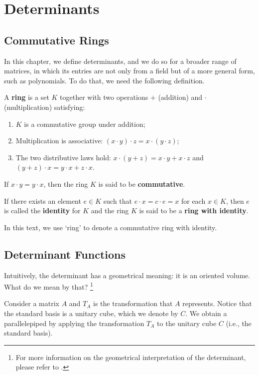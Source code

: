 \chapter{Determinants}\label{chapter:determinants}

\section{Commutative Rings}

In this chapter, we define determinants, and we do so for a broader range of matrices, in which its entries are not only from a field but of a more general form, such as polynomials. To do that, we need the following definition.

\begin{definition}[Ring]
	A \textbf{ring}	is a set $K$ together with two operations $+$ (addition) and $\cdot$ (multiplication) satisfying:
	\begin{enumerate}
		\item $K$ is a commutative group under addition;
		\item Multiplication is associative: $(x \cdot y) \cdot z = x \cdot (y \cdot z)$;
		\item The two distributive laws hold: $x \cdot (y + z) = x \cdot y + x \cdot z$ and $(y + z) \cdot x = y\cdot x + z \cdot x$.
	\end{enumerate}
	
	If $x \cdot y = y \cdot x$, then the ring $K$ is said to be \textbf{commutative}.
	
	If there exists an element $e \in K$ such that $e \cdot x = c \cdot e = x$ for each $x \in K$, then $e$ is called the \textbf{identity} for $K$ and the ring $K$ is said to be a \textbf{ring with identity}.
\end{definition}

In this text, we use `ring' to denote a commutative ring with identity.

\section{Determinant Functions}

Intuitively, the determinant has a geometrical meaning: it is an oriented volume. What do we mean by that? \footnote{For more information on the geometrical interpretation of the determinant, please refer to \cite{dieudonne1969linear}.}

Consider a matrix $A$ and $T_A$ is the transformation that $A$ represents. Notice that the standard basis is a unitary cube, which we denote by $C$. We obtain a parallelepiped by applying the transformation $T_A$ to the unitary cube $C$ (i.e., the standard basis).


